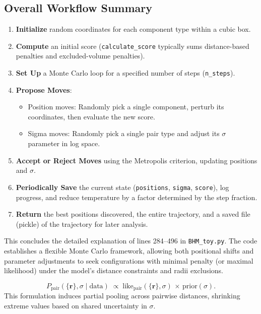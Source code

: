 \documentclass[12pt]{article}
\begin{document}
\subsection{Overall Workflow Summary}
\begin{enumerate}
    \item \textbf{Initialize} random coordinates for each component type within a cubic box.
    \item \textbf{Compute} an initial score (\texttt{calculate\_score} typically sums distance-based penalties and excluded-volume penalties).
    \item \textbf{Set Up} a Monte Carlo loop for a specified number of steps (\texttt{n\_steps}).
    \item \textbf{Propose Moves}:
    \begin{itemize}
        \item Position moves: Randomly pick a single component, perturb its coordinates, then evaluate the new score.
        \item Sigma moves: Randomly pick a single pair type and adjust its $\sigma$ parameter in log space.
    \end{itemize}
    \item \textbf{Accept or Reject Moves} using the Metropolis criterion, updating positions and $\sigma$.
    \item \textbf{Periodically Save} the current state (\texttt{positions}, \texttt{sigma}, \texttt{score}), log progress, and reduce temperature by a factor determined by the step fraction.
    \item \textbf{Return} the best positions discovered, the entire trajectory, and a saved file (pickle) of the trajectory for later analysis.
\end{enumerate}

\noindent
This concludes the detailed explanation of lines 284--496 in \texttt{BHM\_toy.py}. The code establishes a flexible Monte Carlo framework, allowing both positional shifts and parameter adjustments to seek configurations with minimal penalty (or maximal likelihood) under the model’s distance constraints and radii exclusions.

\begin{equation}
    P_{\text{pair}}(\{\mathbf{r}\},\sigma \mid \text{data})
    \;\propto\;
    \mathrm{like}_{\text{pair}}(\{\mathbf{r}\},\sigma)\,\times\,\mathrm{prior}(\sigma).
    \end{equation}
    This formulation induces partial pooling across pairwise distances, shrinking extreme values based on shared uncertainty in $\sigma$.
    
\end{document}

